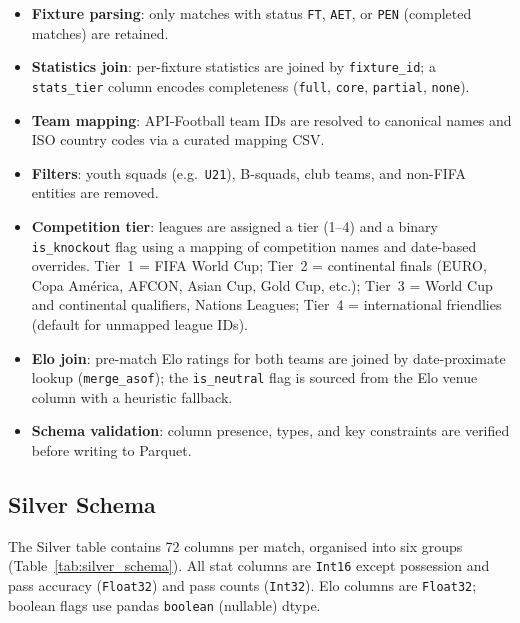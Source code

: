 \documentclass[conference]{IEEEtran}
\begin{document}
\begin{itemize}
  \item \textbf{Fixture parsing}: only matches with status \texttt{FT}, \texttt{AET},
  or \texttt{PEN} (completed matches) are retained.
  \item \textbf{Statistics join}: per-fixture statistics are joined by \texttt{fixture\_id};
  a \texttt{stats\_tier} column encodes completeness (\texttt{full}, \texttt{core},
  \texttt{partial}, \texttt{none}).
  \item \textbf{Team mapping}: API-Football team IDs are resolved to canonical names
  and ISO country codes via a curated mapping CSV.
  \item \textbf{Filters}: youth squads (e.g.\ \texttt{U21}), B-squads, club teams, and
  non-FIFA entities are removed.
  \item \textbf{Competition tier}: leagues are assigned a tier (1–4) and a binary
  \texttt{is\_knockout} flag using a mapping of competition names and date-based overrides.
  Tier~1 = FIFA World Cup; Tier~2 = continental finals (EURO, Copa América, AFCON, Asian Cup,
  Gold Cup, etc.); Tier~3 = World Cup and continental qualifiers, Nations Leagues;
  Tier~4 = international friendlies (default for unmapped league IDs).
  \item \textbf{Elo join}: pre-match Elo ratings for both teams are joined by date-proximate
  lookup (\texttt{merge\_asof}); the \texttt{is\_neutral} flag is sourced from the Elo
  venue column with a heuristic fallback.
  \item \textbf{Schema validation}: column presence, types, and key constraints are
  verified before writing to Parquet.
\end{itemize}

\subsection{Silver Schema}

The Silver table contains 72 columns per match, organised into six groups
(Table~\ref{tab:silver_schema}). All stat columns are \texttt{Int16} except
possession and pass accuracy (\texttt{Float32}) and pass counts (\texttt{Int32}).
Elo columns are \texttt{Float32}; boolean flags use pandas \texttt{boolean}
(nullable) dtype.
\end{document}
